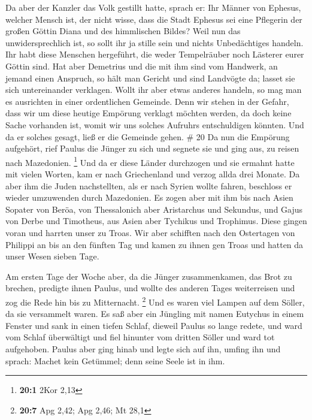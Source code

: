  Da aber der Kanzler das Volk gestillt hatte, sprach er:
Ihr Männer von Ephesus, welcher Mensch ist, der nicht wisse, dass die
Stadt Ephesus sei eine Pflegerin der großen Göttin Diana und des
himmlischen Bildes?  Weil nun das unwidersprechlich ist,
so sollt ihr ja stille sein und nichts Unbedächtiges handeln.
 Ihr habt diese Menschen hergeführt, die weder
Tempelräuber noch Lästerer eurer Göttin sind.  Hat aber
Demetrius und die mit ihm sind vom Handwerk, an jemand einen Anspruch,
so hält man Gericht und sind Landvögte da; lasset sie sich untereinander
verklagen.  Wollt ihr aber etwas anderes handeln, so mag
man es ausrichten in einer ordentlichen Gemeinde.  Denn
wir stehen in der Gefahr, dass wir um diese heutige Empörung verklagt
möchten werden, da doch keine Sache vorhanden ist, womit wir uns solches
Aufruhrs entschuldigen könnten. Und da er solches gesagt, ließ er die
Gemeinde gehen. \# 20  Da nun die Empörung aufgehört, rief
Paulus die Jünger zu sich und segnete sie und ging aus, zu reisen nach
Mazedonien. \footnote{\textbf{20:1} 2Kor 2,13}  Und da er
diese Länder durchzogen und sie ermahnt hatte mit vielen Worten, kam er
nach Griechenland und verzog allda drei Monate.  Da aber
ihm die Juden nachstellten, als er nach Syrien wollte fahren, beschloss
er wieder umzuwenden durch Mazedonien.  Es zogen aber mit
ihm bis nach Asien Sopater von Beröa, von Thessalonich aber Aristarchus
und Sekundus, und Gajus von Derbe und Timotheus, aus Asien aber Tychikus
und Trophimus.  Diese gingen voran und harrten unser zu
Troas.  Wir aber schifften nach den Ostertagen von
Philippi an bis an den fünften Tag und kamen zu ihnen gen Troas und
hatten da unser Wesen sieben Tage.

 Am ersten Tage der Woche aber, da die Jünger
zusammenkamen, das Brot zu brechen, predigte ihnen Paulus, und wollte
des anderen Tages weiterreisen und zog die Rede hin bis zu Mitternacht.
\footnote{\textbf{20:7} Apg 2,42; Apg 2,46; Mt 28,1}  Und
es waren viel Lampen auf dem Söller, da sie versammelt waren.
 Es saß aber ein Jüngling mit namen Eutychus in einem
Fenster und sank in einen tiefen Schlaf, dieweil Paulus so lange redete,
und ward vom Schlaf überwältigt und fiel hinunter vom dritten Söller und
ward tot aufgehoben.  Paulus aber ging hinab und legte
sich auf ihn, umfing ihn und sprach: Machet kein Getümmel; denn seine
Seele ist in ihm.

